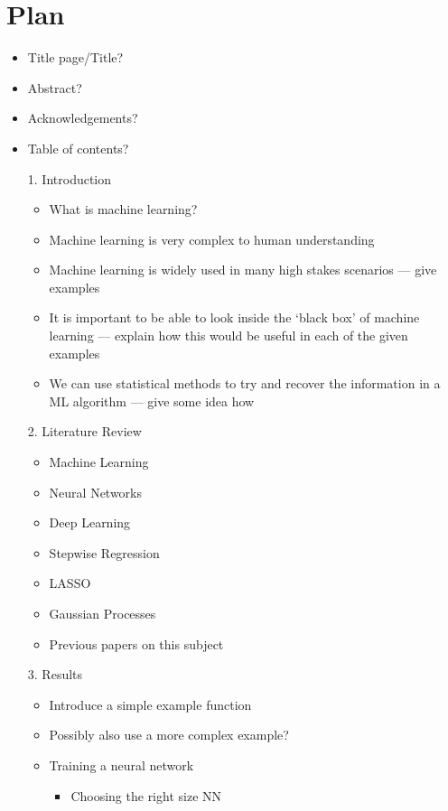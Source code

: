 
\section*{Plan}
\begin{itemize}
	\item Title page/Title?
	\item Abstract?
	\item Acknowledgements?
	\item Table of contents?
	\item[1.] Introduction
	      \begin{itemize}
		      \item What is machine learning?
		      \item Machine learning is very complex to human understanding
		      \item Machine learning is widely used in many high stakes scenarios --- give examples
		      \item It is important to be able to look inside the `black box' of machine learning --- explain how this would be useful in each of the given examples
		      \item We can use statistical methods to try and recover the information in a ML algorithm --- give some idea how
	      \end{itemize}
	\item[2.] Literature Review
	      \begin{itemize}
		      \item Machine Learning
		      \item Neural Networks
		      \item Deep Learning
		      \item Stepwise Regression
		      \item LASSO
		      \item Gaussian Processes
		      \item Previous papers on this subject
	      \end{itemize}
	\item[3.] Results
	      \begin{itemize}
		      \item Introduce a simple example function
		      \item Possibly also use a more complex example?
		      \item Training a neural network
		            \begin{itemize}
			            \item Choosing the right size NN

\end{itemize}
\end{itemize}
\end{itemize}
